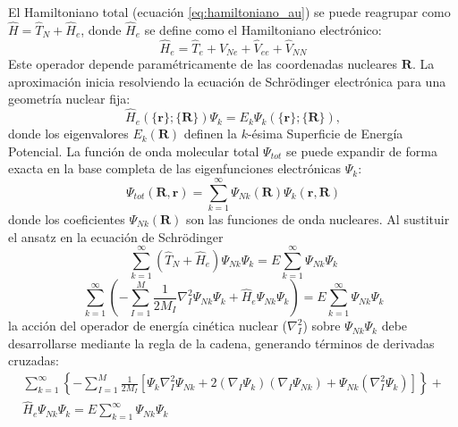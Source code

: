 El Hamiltoniano total (ecuación \ref{eq:hamiltoniano_au}) se puede reagrupar como $\hat{H} = \hat{T}_N + \hat{H}_e$, donde $\hat{H}_e$ se define como el Hamiltoniano electrónico:
\begin{equation}
\hat{H}_e = \hat{T}_e + \hat{V}_{Ne} + \hat{V}_{ee} + \hat{V}_{NN}
\label{eq:hamiltoniano_electronico_res}
\end{equation}
Este operador depende paramétricamente de las coordenadas nucleares $\mathbf{R}$. La aproximación inicia resolviendo la ecuación de Schrödinger electrónica para una geometría nuclear fija:
\begin{equation} 
    \hat{H}_e\left(\{\mathbf{r}\}; \{\mathbf{R}\}\right) \Psi_k = E_k \Psi_k\left(\{\mathbf{r}\}; \{\mathbf{R}\}\right), 
    \label{eq:schrodinger_electronica_res}
\end{equation}
donde los eigenvalores $E_k(\mathbf{R})$ definen la $k$-ésima Superficie de Energía Potencial.
La función de onda molecular total $\Psi_{tot}$ se puede expandir de forma exacta en la base completa de las eigenfunciones electrónicas $\Psi_k$:
\begin{equation}
\Psi_{tot}(\mathbf{R}, \mathbf{r}) = \sum_{k=1}^{\infty} \Psi_{Nk}(\mathbf{R}) \Psi_k(\mathbf{r}, \mathbf{R})
\label{eq:ansatz_BO_res}
\end{equation}
donde los coeficientes $\Psi_{Nk}(\mathbf{R})$ son las funciones de onda nucleares.
Al sustituir el ansatz en la ecuación de Schrödinger
\begin{equation}
    \sum_{k=1}^{\infty} (\hat{T}_N + \hat{H}_e) \Psi_{Nk} \Psi_k = E \sum_{k=1}^{\infty} \Psi_{Nk} \Psi_k 
    \label{eq:schrodinger_total_res}
\end{equation}
\begin{equation}
    \sum_{k=1}^{\infty} \left( -\sum_{I=1}^{M} \frac{1}{2M_I} \nabla^2_I \Psi_{Nk} \Psi_k + \hat{H}_e \Psi_{Nk} \Psi_k \right) = E \sum_{k=1}^{\infty} \Psi_{Nk} \Psi_k
    \label{eq:schrodinger_total_res_2}
\end{equation}
la acción del operador de energía cinética nuclear ($\nabla^2_I$) sobre  $\Psi_{Nk} \Psi_k$ debe desarrollarse mediante la regla de la cadena, generando términos de derivadas cruzadas:
\begin{equation}
    \begin{split}
        \sum_{k=1}^{\infty} \left\{ -\sum_{I=1}^{M} \frac{1}{2M_I} \left[ \Psi_k \nabla^2_I \Psi_{Nk} + 2(\nabla_I \Psi_k)(\nabla_I \Psi_{Nk}) + \Psi_{Nk} (\nabla^2_I \Psi_k) \right] \right\} + \\ \hat{H}_e \Psi_{Nk} \Psi_k = E \sum_{k=1}^{\infty} \Psi_{Nk} \Psi_k 
    \end{split}
    \label{eq:energia}
\end{equation}
